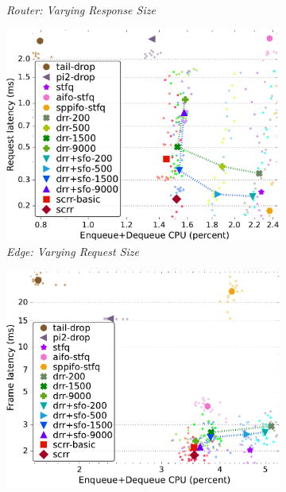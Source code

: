 \begin{figure}[th!]
\begin{subfigure}[t]{.30\linewidth}
    \caption{\small{\textit{Router: Varying Response Size}}}
    \label{fig:reply-1456-cpu-latency-full}
  \end{subfigure}
  \begin{subfigure}[t]{.30\linewidth}
    \centering
    \includegraphics[width=0.95\linewidth]{figs/pkt_size_edge_cn_2t1x32_mn_2tb1x8_mss_1468_kp_lat_comp_methods.pdf}
    \caption{\small{\textit{Edge: Varying Request Size}}}
    \label{fig:request-edge-1456-cpu-latency-full}
  \end{subfigure}
  \begin{subfigure}[t]{.30\linewidth}
    \centering
    \includegraphics[width=0.95\linewidth]{figs/pkt_size_cn_2t4x16_mn_2ui32_mss_1468_kp_lat_comp_methods.pdf}

\end{subfigure}
\end{figure}
